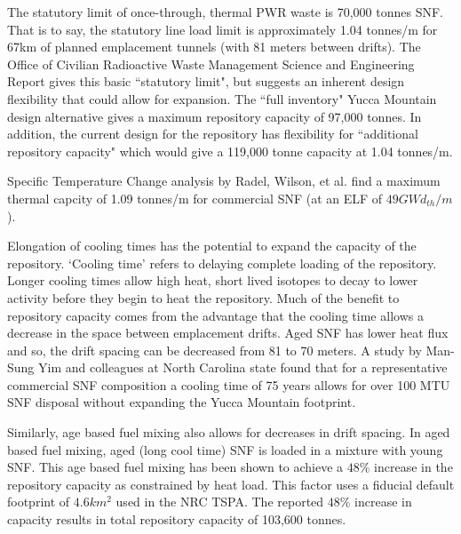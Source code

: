 


The statutory limit of once-through, thermal PWR waste is 70,000 tonnes SNF.
That is to say, the statutory line load limit is approximately 1.04 tonnes/m
for 67km of planned emplacement tunnels (with 81 meters between drifts). The
Office of Civilian Radioactive Waste Management Science and Engineering Report
gives this basic ``statutory limit", but suggests an inherent design
flexibility that could allow for expansion. The ``full inventory" Yucca
Mountain design alternative gives a maximum repository capacity of 97,000
tonnes. In addition, the current design for the repository has flexibility for
``additional repository capacity" which would give a 119,000 tonne capacity at
1.04 tonnes/m.\cite{ doe_yucca_2002}

Specific Temperature Change analysis by Radel, Wilson, et al. find a maximum
thermal capcity of 1.09 tonnes/m for commercial SNF (at an ELF of $49
GWd_{th}/m$).\cite{radel_effect_2007} 

Elongation of cooling times has the potential to expand the capacity of the
repository. `Cooling time' refers to delaying complete loading of the
repository. Longer cooling times allow high heat, short lived isotopes to decay
to lower activity before they begin to heat the repository. Much of the benefit
to repository capacity comes from the advantage that the cooling time allows a
decrease in the space between emplacement drifts. Aged SNF has lower heat flux
and so, the drift spacing can be decreased from 81 to 70 meters. A study by
Man-Sung Yim and colleagues at North Carolina state found that for a
representative commercial SNF composition a cooling time of 75 years allows for
over 100 MTU SNF disposal without expanding the Yucca Mountain
footprint.\cite{li_examining_2007}

Similarly, age based fuel mixing also allows for decreases in drift spacing. In
aged based fuel mixing, aged (long cool time) SNF is loaded in a mixture with
young SNF. This age based fuel mixing has been shown to achieve a $48\%$
increase in the repository capacity as constrained by heat
load.\cite{nicholson_thermal_2007} This factor uses a fiducial default
footprint of $4.6 km^2$ used in the NRC TSPA.  The reported $48\%$ increase in
capacity results in total repository capacity of 103,600
tonnes.\cite{williams_contract_2001}

